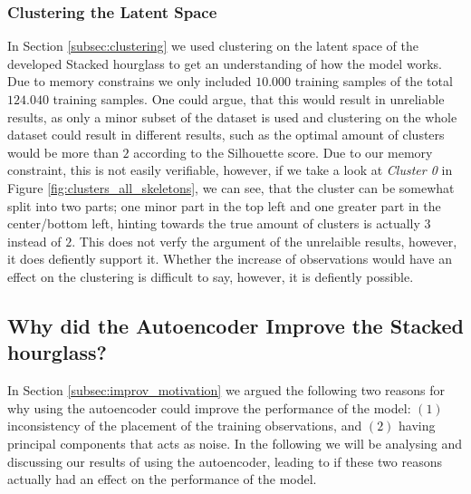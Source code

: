 \documentclass[./main.tex]{subfiles}
\begin{document}
\subsubsection{Clustering the Latent Space}
In Section \ref{subsec:clustering} we used clustering on the latent space of the developed Stacked hourglass to get an understanding of how the model works. Due to memory constrains we only included $10.000$ training samples of the total $124.040$ training samples.  One could argue, that this would result in unreliable results, as only a minor subset of the dataset is used and clustering on the whole dataset could result in different results, such as the optimal amount of clusters would be more than $2$ according to the Silhouette score. Due to our memory constraint, this is not easily verifiable, however, if we take a look at \textit{Cluster 0} in Figure \ref{fig:clusters_all_skeletons}, we can see, that the cluster can be somewhat split into two parts; one minor part in the top left and one greater part in the center/bottom left, hinting towards the true amount of clusters is actually $3$ instead of $2$. This does not verfy the argument of the unrelaible results, however, it does defiently support it. Whether the increase of observations would have an effect on the clustering is difficult to say, however, it is defiently possible.

\subsection{Why did the Autoencoder Improve the Stacked hourglass?}\label{subsec:why_improvement}
In Section \ref{subsec:improv_motivation} we argued the following two reasons for why using the autoencoder could improve the performance of the model: $(1)$ inconsistency of the placement of the training observations, and $(2)$ having principal components that acts as noise. In the following we will be analysing and discussing our results of using the autoencoder, leading to if these two reasons actually had an effect on the performance of the model.
\end{document}
